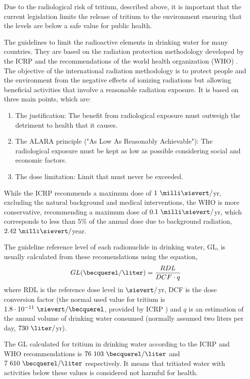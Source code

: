 Due to the radiological risk of tritium, described above, it is important that the current legislation limits the release of tritium to the environment ensuring that the levels are below a safe value for public health.

The guidelines to limit the radioactive elements in drinking water for many countries. They are based on the radiation protection methodology developed by the ICRP \cite{ICRP_GL} and the recommendations of the world health organization (WHO) \cite{WHO_GL}. The objective of the international radiation methodology is to  protect people and the environment from the negative effects of ionizing radiations but allowing beneficial activities that involve a reasonable radiation exposure. It is based on three main points, which are:
\begin{enumerate}
\item{} The justification: The benefit from radiological exposure must outweigh the detriment to health that it causes.
\item{} The ALARA principle ("As Low As Reasonably Achievable"): The radiological exposure must be kept as low as possible considering social and economic factors.
\item{} The dose limitation: Limit that must never be exceeded.
\end{enumerate}

While the ICRP recommends a maximum dose of $1~\milli\sievert/$yr, excluding the natural background and medical interventions, the WHO is more conservative, recommending a maximum dose of $0.1~\milli\sievert/$yr, which corresponds to less than $5\%$ of the annual dose due to background radiation, $2.42~\milli\sievert/$year.

The guideline reference level of each radionuclide in drinking water, GL, is usually calculated from these recomendations using the equation,
\begin{equation}
GL (\becquerel/\liter) = \frac{RDL}{DCF \cdot{} q}
\label{eq:Guideline}
\end{equation}
where RDL is the reference dose level in $\sievert/$yr, DCF is the dose conversion factor (the normal used value for tritium is $1.8 \cdot{} 10^{-11}~\sievert/ \becquerel$, provided by ICRP \cite{ICRP_factor}) and $q$ is an estimation of the annual volume of drinking water consumed (normally assumed two liters per day, $730~\liter/$yr).

The GL calculated for tritium in drinking water according to the ICRP and WHO recommendations is $76~103~\becquerel/\liter$ and $7~610~\becquerel/\liter$  respectively. It means that tritiated water with activities below these values is considered not harmful for health.

